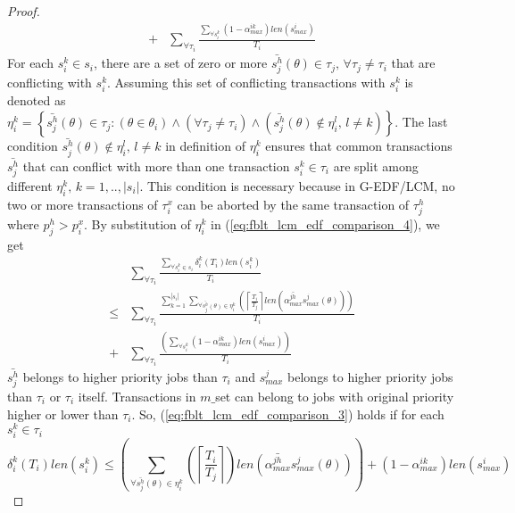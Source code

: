 \documentclass[12pt,english]{report}
\newtheorem{proof}{Proof}
\begin{document}
\begin{proof}
\begin{eqnarray}
+ & \sum_{\forall\tau_{i}}\frac{\sum_{\forall s_{i}^{k}}\left(1-\alpha_{max}^{ik}\right)len\left(s_{max}^{i}\right)}{T_{i}}\nonumber 
\end{eqnarray}
For each $s_{i}^{k}\in s_{i}$, there are a set of zero or more $\bar{s_{j}^{h}}(\theta)\in\tau_{j},\,\forall\tau_{j}\ne\tau_{i}$
that are conflicting with $s_{i}^{k}$. Assuming this set of conflicting
transactions with $s_{i}^{k}$ is denoted as $\eta_{i}^{k}=\left\{ \bar{s_{j}^{h}}(\theta)\in\tau_{j}:\left(\theta\in\theta_{i}\right)\wedge\left(\forall\tau_{j}\ne\tau_{i}\right)\wedge\left(\bar{s_{j}^{h}}(\theta)\not\in\eta_{i}^{l},\, l\ne k\right)\right\} $.
The last condition $\bar{s_{j}^{h}}(\theta)\not\in\eta_{i}^{l},\, l\ne k$
in definition of $\eta_{i}^{k}$ ensures that common transactions
$\bar{s_{j}^{h}}$ that can conflict with more than one transaction
$s_{i}^{k}\in\tau_{i}$ are split among different $\eta_{i}^{k},\, k=1,..,|s_{i}|$.
This condition is necessary because in G-EDF/LCM, no two or more transactions
of $\tau_{i}^{x}$ can be aborted by the same transaction of $\tau_{j}^{h}$
where $p_{j}^{h}>p_{i}^{x}$. By substitution of $\eta_{i}^{k}$ in
(\ref{eq:fblt_lcm_edf_comparison_4}), we get 
\begin{eqnarray}
 & \sum_{\forall\tau_{i}}\frac{\sum_{\forall s_{i}^{k}\in s_{i}}\delta_{i}^{k}(T_{i})len(s_{i}^{k})}{T_{i}}\label{eq:fblt_lcm_edf_comparison_5}\\
\le & \sum_{\forall\tau_{i}}\frac{\sum_{k=1}^{|s_{i}|}\sum_{\forall\bar{s_{j}^{h}}(\theta)\in\eta_{i}^{k}}\left(\left\lceil \frac{T_{i}}{T_{j}}\right\rceil len\left(\bar{\alpha_{max}^{jh}}s_{max}^{j}(\theta)\right)\right)}{T_{i}}\nonumber \\
+ & \sum_{\forall\tau_{i}}\frac{\left(\sum_{\forall s_{i}^{k}}\left(1-\alpha_{max}^{ik}\right)len\left(s_{max}^{i}\right)\right)}{T_{i}}\nonumber 
\end{eqnarray}
$\bar{s_{j}^{h}}$ belongs to higher priority jobs than $\tau_{i}$
and $s_{max}^{j}$ belongs to higher priority jobs than $\tau_{i}$
or $\tau_{i}$ itself. Transactions in $m\_$set can belong to jobs
with original priority higher or lower than $\tau_{i}$. So, (\ref{eq:fblt_lcm_edf_comparison_3})
holds if for each $s_{i}^{k}\in\tau_{i}$ 
\[
\delta_{i}^{k}(T_{i})len(s_{i}^{k})\le\left(\sum_{\forall\bar{s_{j}^{h}}(\theta)\in\eta_{i}^{k}}\left(\left\lceil \frac{T_{i}}{T_{j}}\right\rceil \right)len\left(\bar{\alpha_{max}^{jh}}s_{max}^{j}(\theta)\right)\right)+\left(1-\alpha_{max}^{ik}\right)len\left(s_{max}^{i}\right)
\]
\begin{equation}

\end{equation}
\end{proof}
\end{document}
